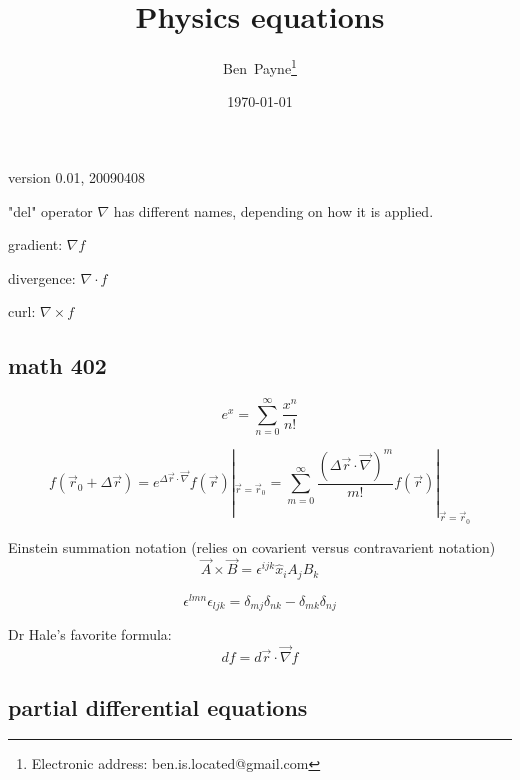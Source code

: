 \documentclass[12pt]{article}  %
\begin{document}
\title{Physics equations}
\author{Ben~Payne\footnote{Electronic address: ben.is.located@gmail.com}}
\date{\today}

\thispagestyle{empty}  %
\pagestyle{empty} %

version 0.01, 20090408


"del" operator $\nabla$ has different names, depending on how it is applied.

gradient: $\nabla f$

divergence: $\nabla \cdot f$

curl: $\nabla \times f$

\subsection{math 402}

\begin{equation}
 e^x = \sum_{n=0}^{\infty} \frac{x^n}{n!}
\end{equation}

\begin{equation}
 f(\vec{r}_0 + \Delta \vec{r})=e^{\Delta \vec{r} \cdot \vec{\nabla}} f(\vec{r}) | _{\vec{r}=\vec{r}_0} = 
\sum_{m=0}^{\infty} \frac{(\Delta \vec{r} \cdot \vec{\nabla})^m}{m!} f(\vec{r}) | _{\vec{r}=\vec{r}_0}
\end{equation}

Einstein summation notation (relies on covarient versus contravarient notation)
\begin{equation}
 \vec{A} \times \vec{B} = \epsilon^{ijk} \hat{x}_i A_j B_k
\end{equation}

\begin{equation}
 \epsilon^{lmn} \epsilon_{ljk} = \delta_{mj} \delta_{nk} - \delta_{mk} \delta_{nj}
\end{equation}

Dr Hale's favorite formula:
\begin{equation}
 df = d\vec{r} \cdot \vec{\nabla}f
\end{equation}

\subsection{partial differential equations}
\end{document}
